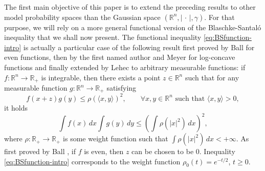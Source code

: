 \documentclass[10pt]{amsart}
\theoremstyle{definition}
\theoremstyle{remark}
\newcommand{\R}{\mathbb{R}}
\begin{document}
The first main objective of this paper is to extend the preceding results to other model probability spaces than the Gaussian space $(\R^n,|\,\cdot\,|,\gamma)$. For that purpose, we will rely on a more general functional version of the Blaschke-Santal\'o inequality that we shall now present. The functional inequality \eqref{eq:BSfunction-intro} is actually a particular case of the following result first proved by Ball \cite{ball86} for even functions, then by the first named author and Meyer \cite{fm07} for log-concave functions and finally extended by Lehec \cite{Lehec1} to arbitrary measurable functions: if $f: \R^n \to \R_+$ is integrable, then there exists a point $z \in \R^n$ such that for any measurable function $g:\R^n \to \R_+$ satisfying 
\[
f(x+z)g(y) \leq \rho(\langle x,y \rangle)^2 ,\qquad \forall x,y\in \R^n \text{ such that } \langle x,y \rangle >0,
\]
it holds 
\begin{equation}\label{eq:BSfunction-gen-intro}
\int f(x)\,dx \int g(y)\,dy \leq \left(\int \rho(|x|^2)\,dx\right)^2,
\end{equation}
where  $\rho : \R_+ \to \R_+$ is some weight function such that $\int \rho(|x|^2)\,dx<+\infty$. As first proved by Ball \cite{ball86}, if $f$ is even, then $z$ can be chosen to be $0$. Inequality \eqref{eq:BSfunction-intro} corresponds to the weight function $\rho_0(t) = e^{-t/2}$, $t\geq0$. 
\end{document}
